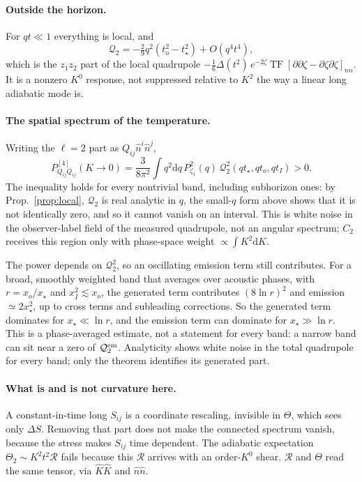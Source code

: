 \documentclass[10pt]{article}
\newcommand{\nh}{\hat n}
\newcommand{\dd}{\mathrm{d}}
\newcommand{\TF}{\operatorname{TF}}
\newcommand{\Q}{\mathcal Q_2}
\newcommand{\R}{\mathcal R}
\newcommand{\Kh}{\hat K}
\begin{document}
\paragraph{Outside the horizon.} For $qt\ll1$ everything is local, and
\begin{equation}
\Q=-\tfrac29q^2(t_o^2-t_\star^2)+O(q^4t^4),
\end{equation}
which is the $z_1z_2$ part of the local quadrupole $-\frac16\Delta(t^2)\,e^{-2\zeta}\TF[\partial\partial\zeta-\partial\zeta\partial\zeta]_{nn}$. It is a nonzero $K^0$ response, not suppressed relative to $K^2$ the way a linear long adiabatic mode is.

\paragraph{The spatial spectrum of the temperature.} Writing the $\ell=2$ part as $Q_{ij}\nh^i\nh^j$,
\begin{equation}
P^{[4]}_{Q_{ij}Q_{ij}}(K\to0)=\frac{3}{8\pi^2}\int q^2\dd q\,P_{\zeta_1}^2(q)\,\Q^2(qt_\star,qt_o,qt_I)>0.
\end{equation}
The inequality holds for every nontrivial band, including subhorizon ones: by Prop.~\ref{prop:local}, $\Q$ is real analytic in $q$, the small-$q$ form above shows that it is not identically zero, and so it cannot vanish on an interval. This is white noise in the observer-label field of the measured quadrupole, not an angular spectrum; $C_2$ receives this region only with phase-space weight $\propto\int K^2\dd K$.

The power depends on $\Q^2$, so an oscillating emission term still contributes. For a broad, smoothly weighted band that averages over acoustic phases, with $r=x_o/x_\star$ and $x_I^2\lesssim x_o$, the generated term contributes $(8\ln r)^2$ and emission $\simeq2x_\star^2$, up to cross terms and subleading corrections. So the generated term dominates for $x_\star\ll\ln r$, and the emission term can dominate for $x_\star\gg\ln r$. This is a phase-averaged estimate, not a statement for every band: a narrow band can sit near a zero of $\Q^{\rm em}$. Analyticity shows white noise in the total quadrupole for every band; only the theorem identifies its generated part.

\paragraph{What is and is not curvature here.} A constant-in-time long $S_{ij}$ is a coordinate rescaling, invisible in $\Theta$, which sees only $\Delta S$. Removing that part does not make the connected spectrum vanish, because the stress makes $S_{ij}$ time dependent. The adiabatic expectation $\Theta_2\sim K^2t^2\R$ fails because this $\R$ arrives with an order-$K^0$ shear. $\R$ and $\Theta$ read the same tensor, via $\Kh\Kh$ and $\nh\nh$.
\end{document}
